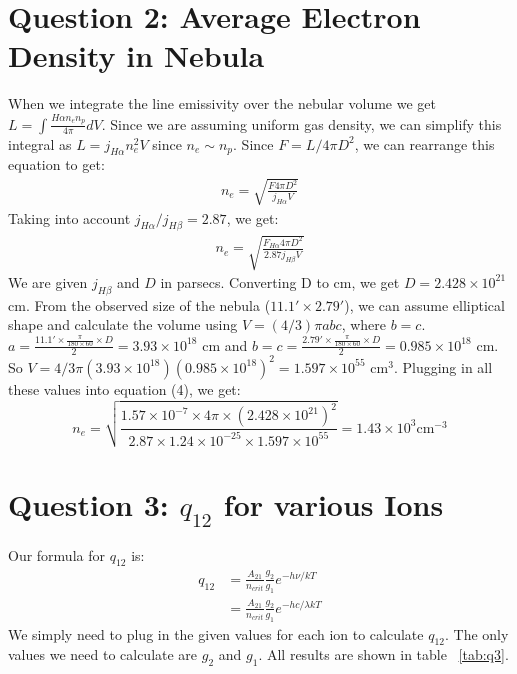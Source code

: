 \documentclass{article}
\begin{document}
\section{Question 2: Average Electron Density in Nebula}
When we integrate the line emissivity over the nebular volume we get $L = \int \frac{H\alpha n_e n_p}{4 \pi} dV$. Since we are assuming uniform gas density, we can simplify this integral as $L = j_{H\alpha}n_e^2 V$ since $n_e \sim n_p$. Since $F = L/4 \pi D^2$, we can rearrange this equation to get:
\begin{align}
n_e = \sqrt{\frac{F 4 \pi D^2}{j_{H\alpha} V}}
\end{align}
Taking into account $j_{H\alpha}/j_{H\beta} = 2.87$, we get:
\begin{align}
n_e = \sqrt{\frac{F_{H\alpha} 4 \pi D^2}{2.87 j_{H\beta} V}}
\end{align}
We are given $j_{H\beta}$ and $D$ in parsecs. Converting D to cm, we get $D = 2.428 \times 10^{21}$ cm. From the observed size of the nebula ($11.1' \times 2.79'$), we can assume elliptical shape and calculate the volume using $V = (4/3) \pi abc$, where $b = c$. $a = \frac{11.1' \times \frac{\pi}{180 \times 60} \times D}{2} = 3.93 \times 10^{18}$ cm and $b = c = \frac{2.79 '\times \frac{\pi}{180 \times 60} \times D}{2} = 0.985 \times 10^{18}$ cm. So $V = 4/3 \pi (3.93 \times 10^{18})(0.985 \times 10^{18})^2 = 1.597 \times 10^{55}$ cm$^3$. Plugging in all these values into equation (4), we get:
\[
n_e = \sqrt{\frac{1.57 \times 10^{-7} \times 4 \pi \times (2.428 \times 10^{21})^2}{2.87 \times 1.24 \times 10^{-25} \times 1.597 \times 10^{55}}} = 1.43 \times 10^3 \mathrm{cm}^{-3}
\]

\section{Question 3: $q_{12}$ for various Ions}
Our formula for $q_{12}$ is:
\begin{align}
q_{12} &= \frac{A_{21}}{n_{crit}}\frac{g_2}{g_1}e^{-h\nu / kT} \\
&= \frac{A_{21}}{n_{crit}}\frac{g_2}{g_1}e^{-hc / \lambda kT}
\end{align}
We simply need to plug in the given values for each ion to calculate $q_{12}$. The only values we need to calculate are $g_2$ and $g_1$. All results are shown in table ~\ref{tab:q3}.
\end{document}
